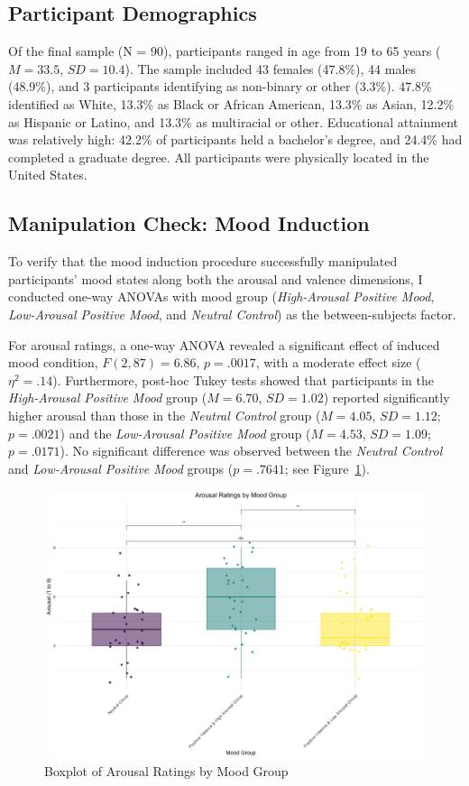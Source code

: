 \documentclass[../MA_Thesis.tex]{subfiles}
\begin{document}
\subsection*{Participant Demographics}

Of the final sample (N = 90), participants ranged in age from 19 to 65 years ($M = 33.5$, $SD = 10.4$). The sample included 43 females (47.8\%), 44 males (48.9\%), and 3 participants identifying as non-binary or other (3.3\%). 47.8\% identified as White, 13.3\% as Black or African American, 13.3\% as Asian, 12.2\% as Hispanic or Latino, and 13.3\% as multiracial or other. Educational attainment was relatively high: 42.2\% of participants held a bachelor’s degree, and 24.4\% had completed a graduate degree. All participants were physically located in the United States.

\subsection*{Manipulation Check: Mood Induction}
To verify that the mood induction procedure successfully manipulated participants’ mood states along both the arousal and valence dimensions, I conducted one-way ANOVAs with mood group (\textit{High-Arousal Positive Mood}, \textit{Low-Arousal Positive Mood}, and
\textit{Neutral Control}) as the between-subjects factor.

For arousal ratings, a one-way ANOVA revealed a significant effect of induced mood condition, $F(2, 87) = 6.86$, $p = .0017$, with a moderate effect size ($\eta^2 = .14$). Furthermore, post-hoc Tukey tests showed that participants in the \textit{High-Arousal Positive Mood} group ($M = 6.70$, $SD = 1.02$) reported significantly higher arousal than those in the \textit{Neutral Control} group ($M = 4.05$, $SD = 1.12$; $p = .0021$) and the \textit{Low-Arousal Positive Mood} group ($M = 4.53$, $SD = 1.09$; $p = .0171$). No significant difference was observed between the \textit{Neutral Control} and \textit{Low-Arousal Positive Mood} groups ($p = .7641$; see Figure~\ref{fig:arousal_group}). 

\begin{figure}[H]
  \centering
  \includegraphics[width=\textwidth]{../analysis/results/main_results/mood_induction_check/arousal_by_group.png}
  \caption{Boxplot of Arousal Ratings by Mood Group}
  \label{fig:arousal_group}
\end{figure}
\end{document}
